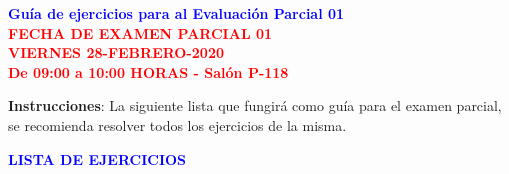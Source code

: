 \documentclass[10pt]{report}
\numberwithin{section}{chapter}
\begin{document}
\begin{center}
\textcolor{blue}{\textbf{\large Guía de ejercicios para al Evaluación Parcial 01}}\\
\vspace{0.5 cm}
\textcolor{red}{\textbf{\large FECHA DE EXAMEN PARCIAL 01 \\ VIERNES 28-FEBRERO-2020\\ De 09:00 a 10:00 HORAS - Salón P-118}}
\end{center}

\textbf{Instrucciones}: La siguiente lista que fungirá como guía para el examen parcial, se recomienda resolver todos los ejercicios de la misma.

\vspace{1cm}


\begin{center}
\textcolor{blue}{\textbf{\large LISTA DE EJERCICIOS}}
\end{center}
\end{document}
